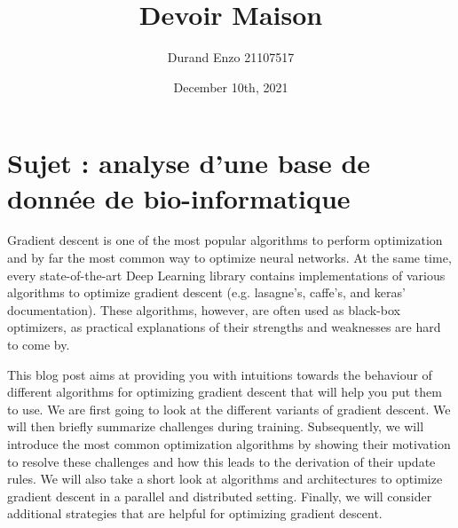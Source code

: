 \documentclass[
	12pt, %
]{fphw}
\title{Devoir Maison} %
\author{Durand Enzo 21107517} %
\date{December 10th, 2021} %
\institute{Sorbonne Université} %
\begin{document}
\maketitle %


\section*{Sujet : analyse d'une base de donnée de bio-informatique}

Gradient descent is one of the most popular algorithms to perform optimization and by far the most common way to optimize neural networks. At the same time, every state-of-the-art Deep Learning library contains implementations of various algorithms to optimize gradient descent (e.g. lasagne's, caffe's, and keras' documentation). These algorithms, however, are often used as black-box optimizers, as practical explanations of their strengths and weaknesses are hard to come by.

This blog post aims at providing you with intuitions towards the behaviour of different algorithms for optimizing gradient descent that will help you put them to use. We are first going to look at the different variants of gradient descent. We will then briefly summarize challenges during training. Subsequently, we will introduce the most common optimization algorithms by showing their motivation to resolve these challenges and how this leads to the derivation of their update rules. We will also take a short look at algorithms and architectures to optimize gradient descent in a parallel and distributed setting. Finally, we will consider additional strategies that are helpful for optimizing gradient descent.

\end{document}
